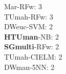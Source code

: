 {{{{Mar-RFw: 3\\
TUmah-RFw: 3\\
DWeuc-SVM: 2\\
\textbf{HTUman}-NB: 2\\
\textbf{SGmulti}-RFw: 2\\
TUmah-CIELM: 2\\
DWman-5NN: 2\\
}}}}
